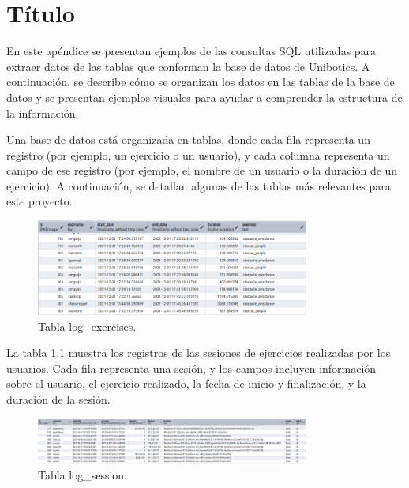 \documentclass[a4paper, 12pt]{book}
\begin{document}

\cleardoublepage
\appendix
\chapter{Título}
\label{sec:appA}


En este apéndice se presentan ejemplos de las consultas SQL utilizadas para extraer datos de las tablas que conforman la base de datos de Unibotics. A continuación, se describe cómo se organizan los datos en las tablas de la base de datos y se presentan ejemplos visuales para ayudar a comprender la estructura de la información.

Una base de datos está organizada en tablas, donde cada fila representa un registro (por ejemplo, un ejercicio o un usuario), y cada columna representa un campo de ese registro (por ejemplo, el nombre de un usuario o la duración de un ejercicio). A continuación, se detallan algunas de las tablas más relevantes para este proyecto.

\begin{figure}
    \centering
    \includegraphics[width=9cm, keepaspectratio]{img/tablalogejercicios.png}
    \caption{Tabla log\_exercises.}\label{fig:tablalogejercicios}
\end{figure}

La tabla \ref{fig:tablalogejercicios} muestra los registros de las sesiones de ejercicios realizadas por los usuarios. Cada fila representa una sesión, y los campos incluyen información sobre el usuario, el ejercicio realizado, la fecha de inicio y finalización, y la duración de la sesión.

\begin{figure}
    \centering
    \includegraphics[width=9cm, keepaspectratio]{img/tablasesiones.png}
    \caption{Tabla log\_session.}\label{fig:tablasesiones}
\end{figure}
\end{document}
